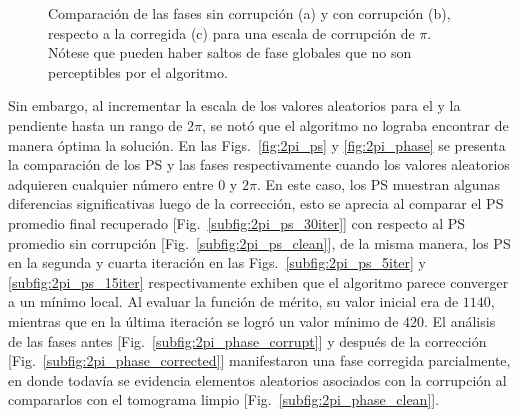 \begin{figure}[ht!]
	\caption[Fase recuperada para una escala de corrupción aleatoria de $\pi$]{Comparación de las fases sin corrupción (a) y con corrupción (b), respecto a la corregida (c) para una escala de corrupción de $\pi$. Nótese que pueden haber saltos de fase globales que no son perceptibles por el algoritmo.}
	\label{fig:phase_pi}
\end{figure}

Sin embargo, al incrementar la escala de los valores aleatorios para el \offset y la pendiente hasta un rango de $2\pi$, se notó que el algoritmo no lograba encontrar de manera óptima la solución. En las Figs.~\ref{fig:2pi_ps} y \ref{fig:2pi_phase} se presenta la comparación de los PS y las fases respectivamente cuando los valores aleatorios adquieren cualquier número entre $0$ y $2\pi$. En este caso, los PS muestran algunas diferencias significativas luego de la corrección, esto se aprecia al comparar el PS promedio final recuperado [Fig.~\ref{subfig:2pi_ps_30iter}] con respecto al PS promedio sin corrupción [Fig.~\ref{subfig:2pi_ps_clean}], de la misma manera, los PS en la segunda y cuarta iteración en las Figs.~\ref{subfig:2pi_ps_5iter} y \ref{subfig:2pi_ps_15iter} respectivamente exhiben que el algoritmo parece converger a un mínimo local. Al evaluar la función de mérito, su valor inicial era de $1140$, mientras que en la última iteración se logró un valor mínimo de $420$. El análisis de las fases antes [Fig.~\ref{subfig:2pi_phase_corrupt}] y después de la corrección [Fig.~\ref{subfig:2pi_phase_corrected}] manifestaron una fase corregida parcialmente, en donde todavía se evidencia elementos aleatorios asociados con la corrupción al compararlos con el tomograma limpio [Fig.~\ref{subfig:2pi_phase_clean}].

